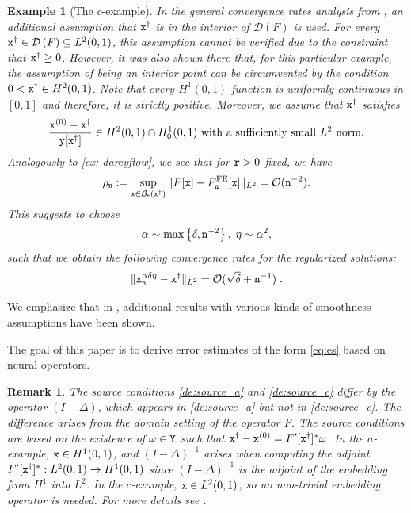 \documentclass[10pt]{article}
\numberwithin{equation}{section}
\newtheorem{example}[example]{Example}
\newtheorem{remark}[remark]{Remark}
\theoremstyle{nonumberplain}
\newcommand{\dom}[1]{\mathcal{D}\left(#1\right)}
\newcommand{\norms}[1]{\|#1\|}
\newcommand{\set}[1]{\left\{#1\right\}}
\newcommand{\Y}{{\tt Y}}
\newcommand{\y}{{\tt y}}
\newcommand{\n}{{\tt n}}
\newcommand{\x}{{\tt x}}
\newcommand{\xdag}{\x^\dagger}
\begin{document}
\begin{example}[The $c$-example]
In the general convergence rates analysis from \cite{NeuSch90}, an additional assumption that $\xdag$ is in the interior of $\dom{F}$ is used. For every $\xdag \in \dom{F} \subseteq L^2(0,1)$, this assumption cannot be verified due to the constraint that $\xdag \geq 0$. However, it was also shown there that, for this particular example, the assumption of being an interior point can be circumvented by the condition 
$0 < \xdag \in H^2(0,1)$. Note that every $H^1(0,1)$ function is uniformly continuous in $[0,1]$ and therefore, it is strictly positive. Moreover, we assume that $\xdag$ satisfies 
    \begin{equation}\label{de:source_c}
     \frac{\x^{(0)}-\xdag}{\y[\xdag]} \in H^2(0,1) \cap H_0^1(0,1) \text{ with } \text{a sufficiently small $L^2$ norm}.
    \end{equation}
    Analogously to \autoref{ex: darcyflow}, we see that for ${\tt r} > 0$ fixed, we have  
    \begin{equation*}
    	\rho_\n :=  \sup_{\x \in \mathcal{B}_{\tt r}(\xdag)} \norms{F[\x] - F^{\text{FE}}_\n[\x]}_{L^2} = \mathcal{O}(\n^{-2}).
    \end{equation*}
    This suggests to choose 
	\begin{equation} \label{eq:par_c}
		\alpha \sim \max \set{\delta,\n^{-2}}, \; \eta \sim \alpha^2,
	\end{equation}
	such that we obtain the following convergence rates for the regularized solutions: 
	\begin{equation} \label{eq:es_c}
		\norms{\x_\n^{\alpha\delta\eta} - \xdag}_{L^2} = \mathcal{O}(\sqrt{\delta}+\n^{-1})\;.
	\end{equation}
\end{example}

We emphasize that in \cite{NeuSch90}, additional results with various kinds of smoothness assumptions have been shown.

The goal of this paper is to derive error estimates of the form \autoref{eq:es} based on neural operators. 

\begin{remark}
    The source conditions \autoref{de:source_a} and \autoref{de:source_c} differ by the operator $(I-\Delta)$, which appears in \autoref{de:source_a} but not in \autoref{de:source_c}. The difference arises from the domain setting of the operator $F$. The source conditions are based on the existence of $\omega \in \Y$ such that $\xdag - \x^{(0)} = F'[\xdag]^*\omega$. In the $a$-example, $\x \in H^1(0,1)$, and $(I-\Delta)^{-1}$ arises when computing the adjoint $F'[\xdag]^*: L^2(0,1) \to H^1(0,1)$ since $(I-\Delta)^{-1}$ is the adjoint of the embedding from $H^1$ into $L^2$. In the $c$-example, $\x \in L^2(0,1)$, so no non-trivial embedding operator is needed. For more details see \cite{EngKunNeu89}.
\end{remark}
\end{document}
